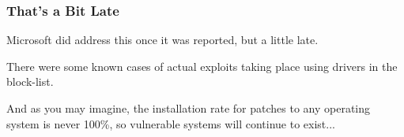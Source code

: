 \begin{frame}
\frametitle{That's a Bit Late}

Microsoft did address this once it was reported, but a little late. 

There were some known cases of actual exploits taking place using drivers in the block-list. 

And as you may imagine, the installation rate for patches to any operating system is never 100\%, so vulnerable systems will continue to exist...



\end{frame}





